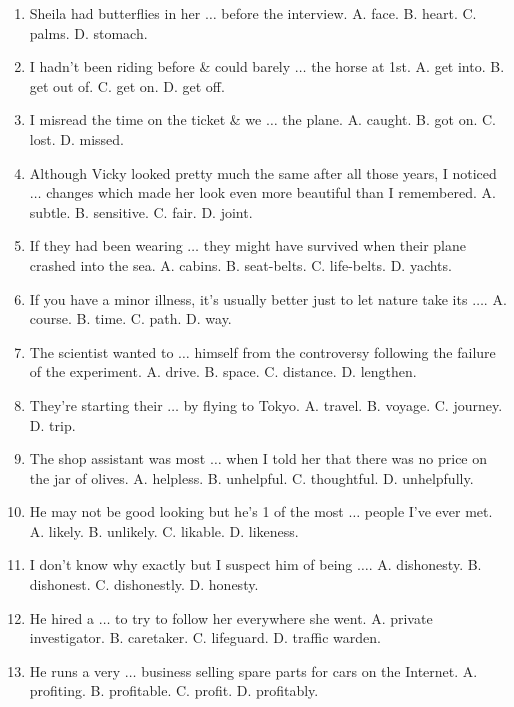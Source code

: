 \documentclass{article}
\numberwithin{equation}{section}
\begin{document}
\begin{enumerate}[leftmargin=2mm]
	\item Sheila had butterflies in her $\ldots$ before the interview. {\sf A.} face. {\sf B.} heart. {\sf C.} palms. {\sf D.} stomach.
	\item I hadn't been riding before \& could barely $\ldots$ the horse at 1st. {\sf A.} get into. {\sf B.} get out of. {\sf C.} get on. {\sf D.} get off.
	\item I misread the time on the ticket \& we $\ldots$ the plane. {\sf A.} caught. {\sf B.} got on. {\sf C.} lost. {\sf D.} missed.
	\item Although Vicky looked pretty much the same after all those years, I noticed $\ldots$ changes which made her look even more beautiful than I remembered. {\sf A.} subtle. {\sf B.} sensitive. {\sf C.} fair. {\sf D.} joint.
	\item If they had been wearing $\ldots$ they might have survived when their plane crashed into the sea. {\sf A.} cabins. {\sf B.} seat-belts. {\sf C.} life-belts. {\sf D.} yachts.
	\item If you have a minor illness, it's usually better just to let nature take its $\ldots$. {\sf A.} course. {\sf B.} time. {\sf C.} path. {\sf D.} way.
	\item The scientist wanted to $\ldots$ himself from the controversy following the failure of the experiment. {\sf A.} drive. {\sf B.} space. {\sf C.} distance. {\sf D.} lengthen.
	\item They're starting their $\ldots$ by flying to Tokyo. {\sf A.} travel. {\sf B.} voyage. {\sf C.} journey. {\sf D.} trip.
	\item The shop assistant was most $\ldots$ when I told her that there was no price on the jar of olives. {\sf A.} helpless. {\sf B.} unhelpful. {\sf C.} thoughtful. {\sf D.} unhelpfully.
	\item He may not be good looking but he's 1 of the most $\ldots$ people I've ever met. {\sf A.} likely. {\sf B.} unlikely. {\sf C.} likable. {\sf D.} likeness.
	\item I don't know why exactly but I suspect him of being $\ldots$. {\sf A.} dishonesty. {\sf B.} dishonest. {\sf C.} dishonestly. {\sf D.} honesty.
	\item He hired a $\ldots$ to try to follow her everywhere she went. {\sf A.} private investigator. {\sf B.} caretaker. {\sf C.} lifeguard. {\sf D.} traffic warden.
	\item He runs a very $\ldots$ business selling spare parts for cars on the Internet. {\sf A.} profiting. {\sf B.} profitable. {\sf C.} profit. {\sf D.} profitably.

\end{enumerate}
\end{document}

